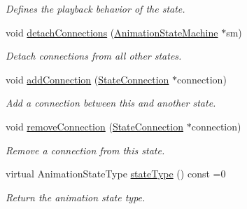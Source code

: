 \begin{Indent}
\begin{DoxyCompactItemize}
\begin{DoxyCompactList}\small\item\em Defines the playback behavior of the state. \end{DoxyCompactList}\item 
\mbox{\label{classrev_1_1_base_animation_state_ab7542d1f6ba3707e6a20eb3f4f7164cb}} 
void \mbox{\hyperlink{classrev_1_1_base_animation_state_ab7542d1f6ba3707e6a20eb3f4f7164cb}{detach\+Connections}} (\mbox{\hyperlink{classrev_1_1_animation_state_machine}{Animation\+State\+Machine}} $\ast$sm)
\begin{DoxyCompactList}\small\item\em Detach connections from all other states. \end{DoxyCompactList}\item 
\mbox{\label{classrev_1_1_base_animation_state_ab9478f6411483e1bccc2cad5f92b13c2}} 
void \mbox{\hyperlink{classrev_1_1_base_animation_state_ab9478f6411483e1bccc2cad5f92b13c2}{add\+Connection}} (\mbox{\hyperlink{classrev_1_1_state_connection}{State\+Connection}} $\ast$connection)
\begin{DoxyCompactList}\small\item\em Add a connection between this and another state. \end{DoxyCompactList}\item 
\mbox{\label{classrev_1_1_base_animation_state_afd3e60f099f4d081c4825a8c54ca9598}} 
void \mbox{\hyperlink{classrev_1_1_base_animation_state_afd3e60f099f4d081c4825a8c54ca9598}{remove\+Connection}} (\mbox{\hyperlink{classrev_1_1_state_connection}{State\+Connection}} $\ast$connection)
\begin{DoxyCompactList}\small\item\em Remove a connection from this state. \end{DoxyCompactList}\item 
\mbox{\label{classrev_1_1_base_animation_state_a0fb164f90cbd9b59a00bab73e74ed2cc}} 
virtual Animation\+State\+Type \mbox{\hyperlink{classrev_1_1_base_animation_state_a0fb164f90cbd9b59a00bab73e74ed2cc}{state\+Type}} () const =0
\begin{DoxyCompactList}\small\item\em Return the animation state type. \end{DoxyCompactList}\item 

\end{DoxyCompactItemize}
\end{Indent}
